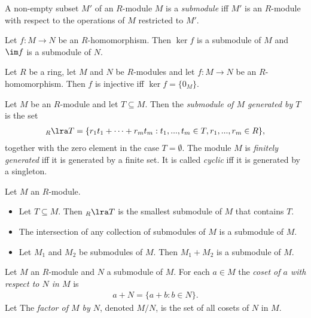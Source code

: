 \documentclass{article}
\begin{document}
\begin{definition}
	A non-empty subset $M'$ of an $R$-module $M$ is a \emph{submodule} iff $M'$ is an
	$R$-module with respect to the operations of $M$ restricted to $M'$.
\end{definition}

\begin{lemma}[Lemma 3.7.21]
	Let $f:M\to N$ be an $R$-homomorphism. Then $\ker f$ is a submodule of $M$ and $\im f$
	is a submodule of $N$.
\end{lemma}

\begin{lemma}[Lemma 3.7.22]
	Let $R$ be a ring, let $M$ and $N$ be $R$-modules and let $f:M\to N$ be an $R$-homomorphism.
	Then $f$ is injective iff $\ker f =\{0_M\}$.
\end{lemma}

\begin{definition}
	Let $M$ be an $R$-module and let $T\subseteq M$. Then the \emph{submodule of $M$ generated by $T$}
	is the set
	\begin{align*}
		_R\lra T = \{r_1t_1+\cdots+r_mt_m:t_1,...,t_m\in T,r_1,...,r_m\in R\},
	\end{align*}
	together with the zero element in the case $T=\emptyset$. The module $M$ is \emph{finitely generated}
	iff it is generated by a finite set. It is called \emph{cyclic} iff it is generated by a singleton.
\end{definition}

\begin{lemma}[Lemma 3.7.28-30]
	Let $M$ an $R$-module.
	\begin{itemize}
		\item Let $T\subseteq M$. Then $_R\lra T$ is the smallest submodule of $M$ that contains $T$.
		\item The intersection of any collection of submodules of $M$ is a submodule of $M$.
		\item Let $M_1$ and $M_2$ be submodules of $M$. Then $M_1+M_2$ is a submodule of $M$.
	\end{itemize}
\end{lemma}

\begin{definition}
	Let $M$ an $R$-module and $N$ a submodule of $M$. For each $a\in M$ the \emph{coset of $a$ with
		respect to $N$ in $M$} is
	\begin{align*}
		a+N=\{a+b:b\in N\}.
	\end{align*}
	Let
	The \emph{factor of $M$ by $N$}, denoted $M/N$, is the set of all cosets of $N$ in $M$.
\end{definition}
\end{document}
